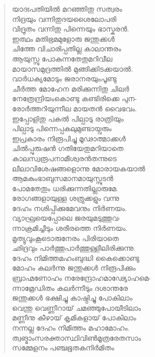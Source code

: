 \begin{verse}
യാദഃപതിയില്‍ മറഞ്ഞിതു സത്വരം\\
നിദ്രയും വന്നിതുദയശൈലോപരി\\
വിദ്രുതം വന്നിതു പിന്നെയും ഭാസ്കരന്‍.\\
ഇത്ഥം മതിഭ്രമമുളോരു ജന്തുക്കള്‍\\
ചിത്തേ വിചാരിപ്പതില്ല കാലാന്തരം\\
ആയുസ്സു പോകുന്നതേതുമറിവീല\\
മായാസമുദ്രത്തില്‍ മുങ്ങിക്കിടക്കയാല്‍.\\
വാര്‍ധക്യമോടും ജരാനരയുംപൂണ്ടു\\
ചീര്‍ത്ത മോഹേന മരിക്കുന്നിതു ചിലര്‍\\
നേത്രേന്ദ്രിയംകൊണ്ടു കണ്ടിരിക്കെ പുന-\\
രോര്‍ത്തറിയുന്നീല മായതന്‍ വൈഭവം.\\
ഇപ്പോളിതു പകല്‍ പില്പാടു രാത്രിയും\\
പില്പാടു പിന്നെപ്പകലുമുണ്ടായ്വരും\\
ഇപ്രകാരം നിരൂപിച്ചു മൂഢാത്മാക്കള്‍\\
ചില്‍പ്പുരുഷന്‍ ഗതിയേതുമറിയാതെ\\
കാലസ്വരൂപനാമീശ്വരന്‍തന്നുടെ\\
ലീലാവിശേഷങ്ങളൊന്നു മോരായകയാല്‍\\
ആമകുംഭാബുസമാനമായുസ്സുടന്‍\\
പോമതേതും ധരിക്കുന്നതില്ലാരുമേ.\\
രോഗങ്ങളായുള്ള ശത്രുക്കളും വന്നു\\
ദേഹം നശിപ്പിക്കുമേവനും നിര്‍ണയം.\\
വ്യാഘ്രയെപ്പോലെ ജരയുമടുത്തുവ-\\
ന്നാക്രമിച്ചീടും ശരീരത്തെ നിര്‍ണയം.\\
മൃത്യുവുംകൂടൊരുനേരം പിരിയാതെ\\
ഛിദ്രവും പാര്‍ത്തുപാര്‍ത്തുള്ളീലിരിക്കുന്നു.\\
ദേഹം നിമിത്തമഹംബുദ്ധി കൈക്കൊണ്ടു\\
മോഹം കലര്‍ന്നു ജന്തുക്കള്‍ നിരൂപിക്കും\\
ബ്രാഹ്മണോഹം നരേന്ദ്രോഹമാഢ്യോഹമെ-\\
ന്നാമ്രേഡിതം കലര്‍ന്നീടും ദശാന്തരേ\\
ജന്തുക്കള്‍ ഭക്ഷിച്ചു കാഷ്ഠിച്ചു പോകിലാം\\
വെന്തു വെണ്ണീറായ് ചമഞ്ഞുപോയീടിലാം\\
മണ്ണീനു കീഴായ് കൃമികളായ് പോകിലാം\\
നന്നല്ല ദേഹം നിമിത്തം മഹാമോഹം.\\
ത്വങ്മാംസരക്താസ്ഥിവിണ്‍മൂത്രരേതസാം\\
സമ്മേളനം പഞ്ചഭൂതകനിര്‍മിതം\\

\end{verse}
